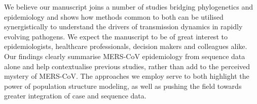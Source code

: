 \documentclass[stdletter,letterpaper,addrfromright,orderfromdateto,dateleft,11pt,noaddrto,sigleft]{newlfm}
\begin{document}
\begin{newlfm}
We believe our manuscript joins a number of studies bridging phylogenetics and epidemiology and shows how methods common to both can be utilised synergistically to understand the drivers of transmission dynamics in rapidly evolving pathogens.
We expect the manuscript to be of great interest to epidemiologists, healthcare professionals, decision makers and colleagues alike.
Our findings clearly summarise MERS-CoV epidemiology from sequence data alone and help contextualise previous studies, rather than add to the perceived mystery of MERS-CoV.
The approaches we employ serve to both highlight the power of population structure modeling, as well as pushing the field towards greater integration of case and sequence data.

\end{newlfm}
\end{document}
